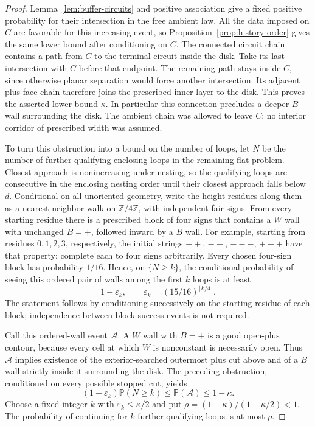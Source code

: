 \documentclass[11pt]{article}
\newcommand{\Z}{\mathbb Z}
\newcommand{\Prob}{\mathbb P}
\theoremstyle{definition}
\theoremstyle{remark}
\numberwithin{equation}{section}
\begin{document}
\begin{proof}
Lemma~\ref{lem:buffer-circuits} and positive association give a fixed
positive probability for their intersection in the free ambient law.
All the data imposed on $C$ are favorable for this increasing event,
so Proposition~\ref{prop:history-order} gives the same lower bound after
conditioning on $C$.  The connected circuit chain contains a path
from $C$ to the terminal circuit inside the disk.  Take its last
intersection with $C$ before that endpoint.  The remaining path stays
inside $C$, since otherwise planar separation would force another
intersection.  Its adjacent plus face chain therefore joins the
prescribed inner layer to the disk.  This proves the asserted lower
bound $\kappa$.  In particular this connection precludes a deeper
$B$ wall surrounding the disk.  The ambient chain was allowed to leave
$C$; no interior corridor of prescribed width was assumed.

To turn this obstruction into a bound on the number of loops, let $N$
be the number of further qualifying enclosing loops in the remaining
flat problem.  Closest approach is nonincreasing under nesting, so the
qualifying loops are consecutive in the enclosing nesting order until
their closest approach falls below $d$.  Conditional on all unoriented
geometry, write the height residues along them as a nearest-neighbor
walk on $\Z/4\Z$, with independent fair signs.  From every starting
residue there is a prescribed block of four signs that contains a
$W$ wall with unchanged $B=+$, followed inward by a $B$ wall.  For
example, starting from residues $0,1,2,3$, respectively, the initial
strings $++$, $--$, $---$, $+++$ have that property; complete each to
four signs arbitrarily.  Every chosen four-sign block has probability
$1/16$.  Hence, on $\{N\geq k\}$, the conditional probability of
seeing this ordered pair of walls among the first $k$ loops is at least
\[
 1-\varepsilon_k,
 \qquad \varepsilon_k=(15/16)^{\lfloor k/4\rfloor}.
\]
The statement follows by conditioning successively on the starting
residue of each block; independence between block-success events is
not required.

Call this ordered-wall event $\mathcal A$.  A $W$ wall with $B=+$ is
a good open-plus contour, because every cell at which $W$ is
nonconstant is necessarily open.  Thus $\mathcal A$ implies existence
of the exterior-searched outermost plus cut above and of a $B$ wall
strictly inside it surrounding the disk.  The preceding obstruction,
conditioned on every possible stopped cut, yields
\[
 (1-\varepsilon_k)\Prob(N\geq k)
 \leq\Prob(\mathcal A)\leq1-\kappa.
\]
Choose a fixed integer $k$ with $\varepsilon_k\leq\kappa/2$ and put
$\rho=(1-\kappa)/(1-\kappa/2)<1$.  The probability of continuing for
$k$ further qualifying loops is at most $\rho$.


\end{proof}
\end{document}
